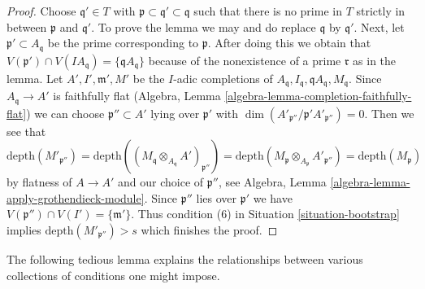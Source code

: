 \documentclass{stacks-project}
\theoremstyle{plain}
\theoremstyle{definition}
\theoremstyle{remark}
\numberwithin{equation}{subsection}
\begin{document}
\begin{proof}
Choose $\mathfrak q' \in T$ with
$\mathfrak p \subset \mathfrak q' \subset \mathfrak q$
such that there is no prime in $T$ strictly
in between $\mathfrak p$ and $\mathfrak q'$. To prove the lemma
we may and do replace $\mathfrak q$ by $\mathfrak q'$.
Next, let $\mathfrak p' \subset A_\mathfrak q$ be the prime corresponding to
$\mathfrak p$. After doing this we obtain that
$V(\mathfrak p') \cap V(IA_\mathfrak q) = \{\mathfrak q A_\mathfrak q\}$
because of the nonexistence of a prime $\mathfrak r$ as in the lemma.
Let $A', I', \mathfrak m', M'$ be the $I$-adic completions of
$A_\mathfrak q, I_\mathfrak q, \mathfrak qA_\mathfrak q, M_\mathfrak q$.
Since $A_\mathfrak q \to A'$ is faithfully flat
(Algebra, Lemma \ref{algebra-lemma-completion-faithfully-flat})
we can choose $\mathfrak p'' \subset A'$ lying over $\mathfrak p'$
with $\dim(A'_{\mathfrak p''}/\mathfrak p' A'_{\mathfrak p''}) = 0$.
Then we see that
$$
\text{depth}(M'_{\mathfrak p''}) =
\text{depth}((M_\mathfrak q \otimes_{A_\mathfrak q} A')_{\mathfrak p''}) =
\text{depth}(M_\mathfrak p \otimes_{A_\mathfrak p} A'_{\mathfrak p''}) =
\text{depth}(M_\mathfrak p)
$$
by flatness of $A \to A'$ and our choice of $\mathfrak p''$, see
Algebra, Lemma \ref{algebra-lemma-apply-grothendieck-module}.
Since $\mathfrak p''$ lies over $\mathfrak p'$ we have
$V(\mathfrak p'') \cap V(I') = \{\mathfrak m'\}$. Thus
condition (6) in Situation \ref{situation-bootstrap} implies
$\text{depth}(M'_{\mathfrak p''}) > s$ which finishes the proof.
\end{proof}

\noindent
The following tedious lemma explains the relationships between various
collections of conditions one might impose.
\end{document}
